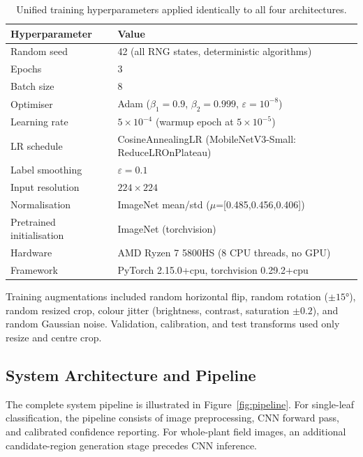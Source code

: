 \documentclass[pdflatex,sn-mathphys-num]{sn-jnl}
\begin{document}
\begin{table}[H]
\caption{Unified training hyperparameters applied identically to all four architectures.}
\label{tab:training_config}
\centering
\begin{tabular}{ll}
\toprule
\textbf{Hyperparameter} & \textbf{Value} \\
\midrule
Random seed & 42 (all RNG states, deterministic algorithms) \\
Epochs & 3 \\
Batch size & 8 \\
Optimiser & Adam ($\beta_1=0.9$, $\beta_2=0.999$, $\varepsilon=10^{-8}$) \\
Learning rate & $5 \times 10^{-4}$ (warmup epoch at $5 \times 10^{-5}$) \\
LR schedule & CosineAnnealingLR (MobileNetV3-Small: ReduceLROnPlateau) \\
Label smoothing & $\varepsilon = 0.1$ \\
Input resolution & $224 \times 224$ \\
Normalisation & ImageNet mean/std ($\mu$=[0.485,0.456,0.406]) \\
Pretrained initialisation & ImageNet (torchvision) \\
Hardware & AMD Ryzen 7 5800HS (8 CPU threads, no GPU) \\
Framework & PyTorch 2.15.0+cpu, torchvision 0.29.2+cpu \\
\bottomrule
\end{tabular}
\end{table}

\noindent Training augmentations included random horizontal flip, random rotation
($\pm15°$), random resized crop, colour jitter (brightness, contrast, saturation
$\pm0.2$), and random Gaussian noise. Validation, calibration, and test transforms
used only resize and centre crop.

\subsection{System Architecture and Pipeline}
\label{sec:system_pipeline}

The complete system pipeline is illustrated in Figure~\ref{fig:pipeline}. For single-leaf
classification, the pipeline consists of image preprocessing, CNN forward pass, and
calibrated confidence reporting. For whole-plant field images, an additional candidate-region
generation stage precedes CNN inference.
\end{document}
